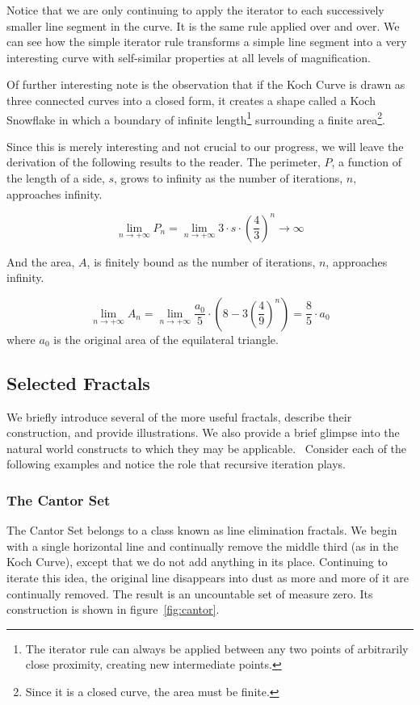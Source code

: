 \documentclass[jou,apacite]{apa6}
\begin{document}
Notice that we are only continuing to apply the iterator to each successively smaller line segment in the curve.  It is the same rule applied over and over.  We can see how the simple iterator rule transforms a simple line segment into a very interesting curve with self-similar properties at all levels of magnification.

Of further interesting note is the observation that if the Koch Curve is drawn as three connected curves into a closed form, it creates a shape called a Koch Snowflake in which a boundary of infinite length\footnote{The iterator rule can always be applied between any two points of arbitrarily close proximity, creating new intermediate points.} surrounding a finite area\footnote{Since it is a closed curve, the area must be finite.}.

Since this is merely interesting and not crucial to our progress, we will leave the derivation of the following results to the reader.  The perimeter, $P$, a function of the length of a side, $s$, grows to infinity as the number of iterations, $n$, approaches infinity.

\[\lim_{n \to +\infty}P_n = \lim_{n \to +\infty} 3\cdot s\cdot\left(\frac{4}{3}\right)^n\to\infty\]

And the area, $A$, is finitely bound as the number of iterations, $n$, approaches infinity.

\[\lim_{n \to +\infty}A_n = \lim_{n \to +\infty}\frac{a_0}{5}\cdot\left(8-3\left(\frac{4}{9}\right)^n\right)=\frac{8}{5}\cdot a_0\]
where $a_0$ is the original area of the equilateral triangle.

\subsection{Selected Fractals}
We briefly introduce several of the more useful fractals, describe their construction, and provide illustrations.  We also provide a brief glimpse into the natural world constructs to which they may be applicable.~\cite{Peitgen} Consider each of the following examples and notice the role that recursive iteration plays.

\subsubsection{The Cantor Set}
The Cantor Set belongs to a class known as line elimination fractals.  We begin with a single horizontal line and continually remove the middle third (as in the Koch Curve), except that we do not add anything in its place.  Continuing to iterate this idea, the original line disappears into dust as more and more of it are continually removed.  The result is an uncountable set of measure zero.  Its construction is shown in figure~\ref{fig:cantor}.
\end{document}
